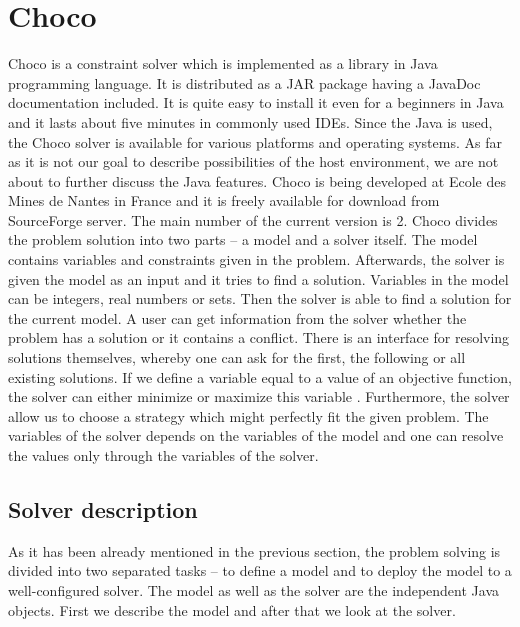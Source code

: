 \section{Choco}

Choco is a constraint solver which is implemented as a library in Java programming language.
It is distributed as a JAR package having a JavaDoc documentation included. It is quite easy
to install it even for a beginners in Java and it lasts about five minutes in commonly used
IDEs. Since the Java is used, the Choco solver is available for various platforms
and operating systems. As far as it is not our goal to describe possibilities of the host environment, 
we are not about to further discuss the Java features. Choco is being developed
at Ecole des Mines de Nantes in France and it is freely available for download from 
SourceForge server. The main number of the current version is 2. Choco divides the problem solution
into two parts -- a model and a solver itself. The model contains variables and constraints given 
in the problem. Afterwards, the solver is given the model as an input and it tries to find a solution. 
Variables in the model can be integers, real numbers or sets. Then the solver is able to
find a solution for the current model. A user can get information from the solver whether the 
problem has a solution or it contains a conflict. There is an interface for resolving solutions themselves, 
whereby one can ask for the first, the following or all existing solutions. If we define a variable
equal to a value of an objective function, the solver can either minimize or maximize this variable .
Furthermore, the solver allow us to choose a strategy which might perfectly fit the given problem.
The variables of the solver depends on the variables of the model and one can resolve the values only through
the variables of the solver.

\subsection{Solver description}
As it has been already mentioned in the previous section, the problem solving is divided
into two separated tasks -- to define a model and to deploy the model to a well-configured solver.
The model as well as the solver are the independent Java objects. First we describe the 
model and after that we look at the solver. 

